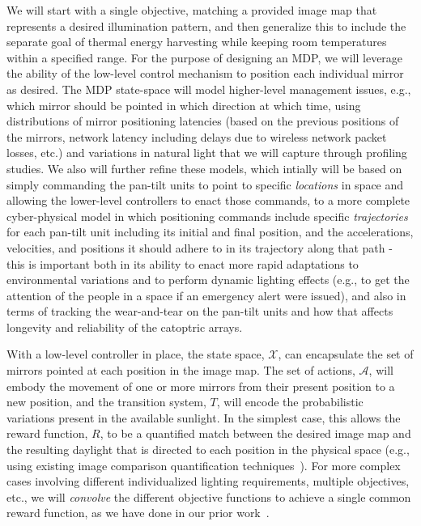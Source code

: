 We will start with a single objective, matching a provided image map that represents a 
desired illumination pattern, and then generalize this to include the separate goal of 
thermal energy harvesting while keeping room temperatures within a specified range.
For the purpose of designing an MDP, we will leverage the ability of the low-level
control mechanism to position each individual mirror as desired.  The MDP state-space 
will model higher-level management issues, e.g., which mirror should be pointed in which 
direction at which time, using distributions of mirror positioning latencies (based on 
the previous positions of the mirrors, network latency including delays due to wireless
network packet losses, etc.) and variations in natural light that we will capture through 
profiling studies.  We also will further refine these models, which intially will be based
on simply commanding the pan-tilt units to point to specific \emph{locations} in space and 
allowing the lower-level controllers to enact those commands, to a more complete cyber-physical
model in which positioning commands include specific \emph{trajectories} for each pan-tilt 
unit including its initial and final position, and the accelerations, velocities, and positions
it should adhere to in its trajectory along that path - this is important both in its
ability to enact more rapid adaptations to environmental variations and to perform dynamic
lighting effects (e.g., to get the attention of the people in a space if an emergency
alert were issued), and also in terms of tracking the wear-and-tear on the pan-tilt units and 
how that affects longevity and reliability of the catoptric arrays.

With a low-level controller in place, the state space, $\mathcal{X}$,
can encapsulate the set of mirrors pointed at each position in
the image map.  The set of actions, $\mathcal{A}$, will embody the movement
of one or more mirrors from their present position to a new position,
and the transition system, $T$, will encode the probabilistic variations
present in the available sunlight.  In the simplest case, this allows the 
reward function, $R$, to be a quantified match between the desired image 
map and the resulting daylight that is directed to each position in the physical space
(e.g., using existing image comparison quantification techniques~\cite{ds99,my09,wbo97}).
For more complex cases involving different individualized lighting requirements,
multiple objectives, etc., we will \emph{convolve} the different objective
functions to achieve a single common reward function, as we have done
in our prior work~\cite{tblwgs11,tggs10}.

